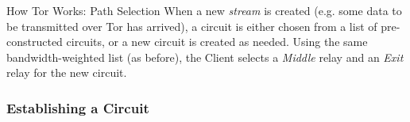 \documentclass[9pt,a4paper]{beamer}
\begin{document}
\begin{frame}{How Tor Works: Path Selection}
  When a new \emph{stream} is created (e.g. some data to be transmitted over Tor has arrived), a
  circuit is either chosen from a list of pre-constructed circuits, or a new circuit is created as
  needed. Using the same bandwidth-weighted list (as before), the Client selects a \emph{Middle}
  relay and an \emph{Exit} relay for the new circuit.
\end{frame}


\begin{frame}
  \frametitle{Establishing a Circuit}
\end{frame}
\end{document}
